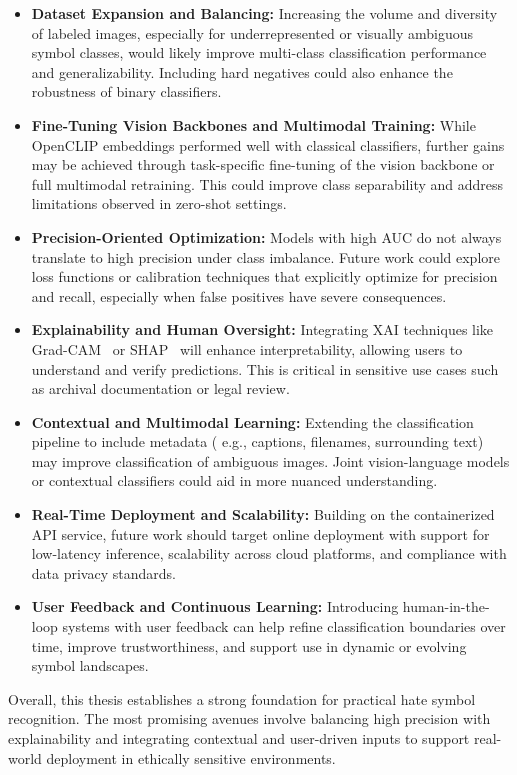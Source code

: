 \begin{itemize}
    \item \textbf{Dataset Expansion and Balancing:} Increasing the volume and diversity of labeled images,
    especially for underrepresented or visually ambiguous symbol classes, would likely improve multi-class
    classification performance and generalizability. Including hard negatives could also enhance the robustness of
    binary classifiers.

    \item \textbf{Fine-Tuning Vision Backbones and Multimodal Training:} While OpenCLIP embeddings performed well
    with classical classifiers, further gains may be achieved through task-specific fine-tuning of the vision
    backbone or full multimodal retraining. This could improve class separability and address limitations observed
    in zero-shot settings.

    \item \textbf{Precision-Oriented Optimization:} Models with high \ac{AUC} do not always translate to high
    precision under class imbalance. Future work could explore loss functions or calibration techniques that
    explicitly optimize for precision and recall, especially when false positives have severe consequences.

    \item \textbf{Explainability and Human Oversight:} Integrating \ac{XAI} techniques like
    \ac{Grad-CAM}~\parencite{Selvaraju_2019} or \ac{SHAP}~\parencite{SHAP2025}
    will enhance interpretability, allowing users to understand and verify predictions. This is critical in
    sensitive use cases such as archival documentation or legal review.

    \item \textbf{Contextual and Multimodal Learning:} Extending the classification pipeline to include metadata (
    e.g., captions, filenames, surrounding text) may improve classification of ambiguous images. Joint
    vision-language models or contextual classifiers could aid in more nuanced understanding.

    \item \textbf{Real-Time Deployment and Scalability:} Building on the containerized \ac{API} service, future work
    should target online deployment with support for low-latency inference, scalability across cloud platforms, and
    compliance with data privacy standards.

    \item \textbf{User Feedback and Continuous Learning:} Introducing human-in-the-loop systems with user feedback
    can help refine classification boundaries over time, improve trustworthiness, and support use in dynamic or
    evolving symbol landscapes.

\end{itemize}

Overall, this thesis establishes a strong foundation for practical hate symbol recognition. The most promising
avenues involve balancing high precision with explainability and integrating contextual and user-driven inputs to
support real-world deployment in ethically sensitive environments.
